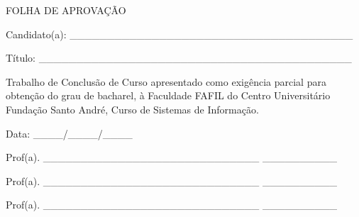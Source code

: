 \thispagestyle{empty}

\vspace{3cm}
\begin{center}
FOLHA DE APROVAÇÃO \\
\end{center}

\vspace{3cm}

\hspace{-2cm} Candidato(a): \_\_\_\_\_\_\_\_\_\_\_\_\_\_\_\_\_\_\_\_\_\_\_\_\_\_\_\_\_\_\_\_\_\_\_\_\_\_

\vspace{0.5cm}

\hspace{-2cm} Título: \_\_\_\_\_\_\_\_\_\_\_\_\_\_\_\_\_\_\_\_\_\_\_\_\_\_\_\_\_\_\_\_\_\_\_\_\_\_\_\_\_\_

\vspace{3cm}

Trabalho de Conclusão de Curso apresentado como exigência parcial para obtenção
do grau de bacharel, à Faculdade FAFIL do Centro Universitário Fundação Santo André,
Curso de Sistemas de Informação.\\

\vspace{3cm}

\hspace{-2cm} Data: \_\_\_\_/\_\_\_\_/\_\_\_\_

\vspace{1cm}

\hspace{-2cm} Prof(a). \_\_\_\_\_\_\_\_\_\_\_\_\_\_\_\_\_\_\_\_\_\_\_\_\_\_\_\_\_  \hspace{1cm}\_\_\_\_\_\_\_\_\_\_
\vspace{0.5cm}

\hspace{-2cm} Prof(a). \_\_\_\_\_\_\_\_\_\_\_\_\_\_\_\_\_\_\_\_\_\_\_\_\_\_\_\_\_  \hspace{1cm}\_\_\_\_\_\_\_\_\_\_
\vspace{0.5cm}

\hspace{-2cm} Prof(a). \_\_\_\_\_\_\_\_\_\_\_\_\_\_\_\_\_\_\_\_\_\_\_\_\_\_\_\_\_  \hspace{1cm}\_\_\_\_\_\_\_\_\_\_
